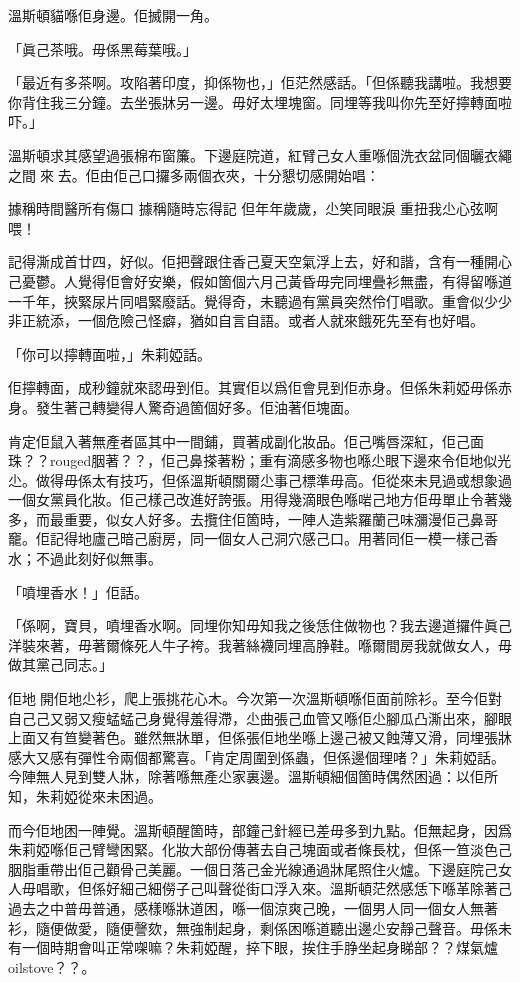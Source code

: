 溫斯頓貓喺佢身邊。佢搣開一角。

「眞己茶哦。毋係黑莓葉哦。」

「最近有多茶啊。攻陷著印度，抑係物也，」佢茫然感話。「但係聽我講啦。我想要你背住我三分鐘。去坐張牀另一邊。毋好太埋塊窗。同埋等我叫你先至好擰轉面啦吓。」

溫斯頓求其感望過張棉布窗簾。下邊庭院道，紅臂己女人重喺個洗衣盆同個曬衣繩之間𨆐來𨆐去。佢由佢己口攞多兩個衣夾，十分懇切感開始唱：

	據稱時間醫所有傷口
	據稱隨時忘得記
	但年年歲歲，尐笑同眼淚
	重扭我尐心弦啊喂！

記得澌成首廿四，好似。佢把聲跟住香己夏天空氣浮上去，好和諧，含有一種開心己憂鬱。人覺得佢會好安樂，假如箇個六月己黃昏毋完同埋疊衫無盡，有得留喺道一千年，挾緊尿片同唱緊廢話。覺得奇，未聽過有黨員突然伶仃唱歌。重會似少少非正統添，一個危險己怪癖，猶如自言自語。或者人就來餓死先至有也好唱。

「你可以擰轉面啦，」朱莉婭話。

佢擰轉面，成秒鐘就來認毋到佢。其實佢以爲佢會見到佢赤身。但係朱莉婭毋係赤身。發生著己轉變得人驚奇過箇個好多。佢油著佢塊面。

肯定佢鼠入著無產者區其中一間鋪，買著成副化妝品。佢己嘴唇深紅，佢己面珠？？rouged胭著？？，佢己鼻搽著粉；重有滴感多物也喺尐眼下邊來令佢地似光尐。做得毋係太有技巧，但係溫斯頓關爾尐事己標準毋高。佢從來未見過或想𧰼過一個女黨員化妝。佢己樣己改進好誇張。用得幾滴眼色喺啱己地方佢毋單止令著幾多，而最重要，似女人好多。去攬住佢箇時，一陣人造紫羅蘭己味瀰漫佢己鼻哥竉。佢記得地廬己暗己廚房，同一個女人己洞穴感己口。用著同佢一模一樣己香水；不過此刻好似無事。

「噴埋香水！」佢話。

「係啊，寶貝，噴埋香水啊。同埋你知毋知我之後恁住做物也？我去邊道攞件眞己洋裝來著，毋著爾條死人牛子袴。我著絲襪同埋高㬹鞋。喺爾間房我就做女人，毋做其黨己同志。」

佢地𠌸開佢地尐衫，爬上張挑花心木。今次第一次溫斯頓喺佢面前除衫。至今佢對自己己又弱又瘦蜢蜢己身覺得羞得滯，尐曲張己血管又喺佢尐腳瓜凸澌出來，腳眼上面又有笪變著色。雖然無牀單，但係張佢地坐喺上邊己被又蝕薄又滑，同埋張牀感大又感有彈性令兩個都驚喜。「肯定周圍到係蟲，但係邊個理啫？」朱莉婭話。今陣無人見到雙人牀，除著喺無產尐家裏邊。溫斯頓細個箇時偶然困過：以佢所知，朱莉婭從來未困過。

而今佢地困一陣覺。溫斯頓醒箇時，部鐘己針經已差毋多到九點。佢無起身，因爲朱莉婭喺佢己臂彎困緊。化妝大部份傳著去自己塊面或者條長枕，但係一笪淡色己胭脂重帶出佢己顴骨己美麗。一個日落己金光線通過牀尾照住火爐。下邊庭院己女人毋唱歌，但係好細己細僗子己叫聲從街口浮入來。溫斯頓茫然感恁下喺革除著己過去之中普毋普通，感樣喺牀道困，喺一個涼爽己晚，一個男人同一個女人無著衫，隨便做愛，隨便謦欬，無強制起身，剩係困喺道聽出邊尐安靜己聲音。毋係未有一個時期會叫正常㗎嘛？朱莉婭醒，捽下眼，挨住手㬹坐起身睇部？？煤氣爐oilstove？？。

